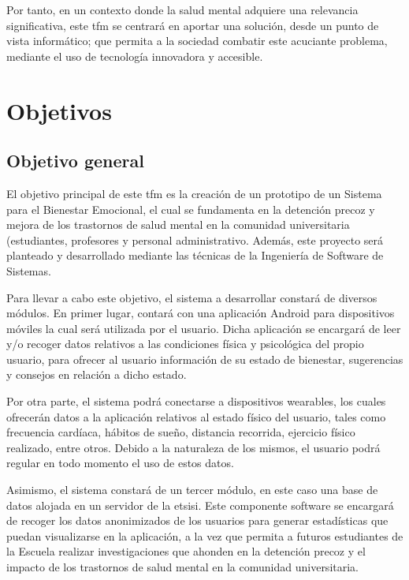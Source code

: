 Por tanto, en un contexto donde la salud mental adquiere una relevancia significativa, este \gls{tfm} se centrará en aportar una solución, desde un punto de vista informático; que permita a la sociedad combatir este acuciante problema, mediante el uso de tecnología innovadora y accesible.

\section{Objetivos}
    \label{sec:objetivos}

    \subsection{Objetivo general}

        El objetivo principal de este \gls{tfm} es la creación de un prototipo de un Sistema para el Bienestar Emocional, el cual se fundamenta en la detención precoz y mejora de los trastornos de salud mental en la comunidad universitaria (estudiantes, profesores y personal administrativo.  Además, este proyecto será planteado y desarrollado mediante las técnicas de la Ingeniería de Software de Sistemas.
    
        Para llevar a cabo este objetivo, el sistema a desarrollar constará de diversos módulos. En primer lugar, contará con una aplicación Android para dispositivos móviles la cual será utilizada por el usuario. Dicha aplicación se encargará de leer y/o recoger datos relativos a las condiciones física y psicológica del propio usuario, para ofrecer al usuario información de su estado de bienestar, sugerencias y consejos en relación a dicho estado.
    
        Por otra parte, el sistema podrá conectarse a dispositivos \glspl{wearable}, los cuales ofrecerán datos a la aplicación relativos al estado físico del usuario, tales como frecuencia cardíaca, hábitos de sueño, distancia recorrida, ejercicio físico realizado, entre otros. 
        Debido a la naturaleza de los mismos, el usuario podrá regular en todo momento el uso de estos datos.
    
        Asimismo, el sistema constará de un tercer módulo, en este caso una base de datos alojada en un servidor de la \gls{etsisi}. Este componente software se encargará de recoger los datos anonimizados de los usuarios para generar estadísticas que puedan visualizarse en la aplicación, a la vez que permita a futuros estudiantes de la Escuela realizar investigaciones que ahonden en la detención precoz y el impacto de los trastornos de salud mental en la comunidad universitaria.

